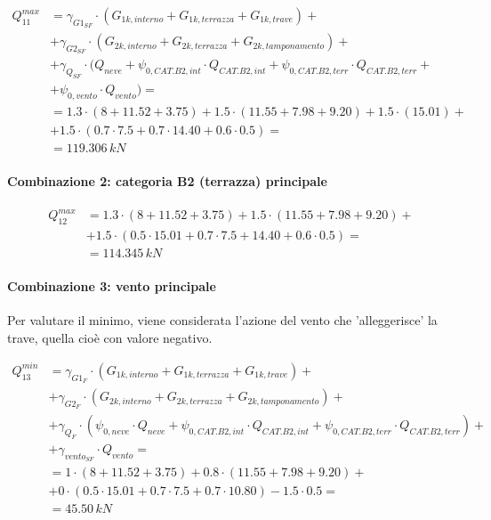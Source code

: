 \begin{align*}
	Q_{11}^{max} &=\gamma_{G1_{SF}}\cdot\left( G_{1k, interno} + G_{1k, terrazza} + G_{1k, trave} \right) +\\
	&+\gamma_{G2_{SF}}\cdot\left( G_{2k, interno} + G_{2k, terrazza} + G_{2k, tamponamento} \right) +\\
	&+\gamma_{Q_{SF}}\cdot (Q_{neve} + \psi_{0,CAT.B2,int}\cdot Q_{CAT.B2,int} + \psi_{0,CAT.B2,terr}\cdot Q_{CAT.B2,terr} +\\
	&+\psi_{0,vento}\cdot Q_{vento}) =\\
	&= 1.3\cdot(8+11.52 + 3.75)	+1.5\cdot(11.55+7.98 + 9.20) + 1.5\cdot(15.01) +\\
	&+1.5\cdot(0.7\cdot7.5+ 0.7\cdot 14.40 + 0.6\cdot 0.5) = \\
	&= 	119.306\,kN
\end{align*}






\paragraph{Combinazione 2: categoria B2 (terrazza) principale}

\begin{align*}
	Q_{12}^{max} &= 1.3\cdot(8+11.52 + 3.75) 
	+1.5\cdot(11.55+7.98 + 9.20) +\\
	&+1.5\cdot(0.5\cdot 15.01 + 0.7\cdot7.5+ 14.40 + 0.6\cdot 0.5) = \\
	&= 	114.345\,kN
\end{align*}

\paragraph{Combinazione 3: vento principale}
Per valutare il minimo, viene considerata l'azione del vento che 'alleggerisce' la trave, quella cioè con valore negativo.

\begin{align*}
	Q_{13}^{min} &=\gamma_{G1_{F}}\cdot\left( G_{1k, interno} + G_{1k, terrazza} + G_{1k, trave} \right) +\\
	&+\gamma_{G2_{F}}\cdot\left( G_{2k, interno} + G_{2k, terrazza} + G_{2k, tamponamento} \right) +\\
	&+\gamma_{Q_{F}}\cdot (\psi_{0,neve}\cdot Q_{neve} + \psi_{0,CAT.B2,int}\cdot Q_{CAT.B2,int} + \psi_{0,CAT.B2,terr}\cdot Q_{CAT.B2,terr}) +\\
	&+ \gamma_{vento_{SF}}\cdot Q_{vento} =\\
	&= 1\cdot(8+11.52 + 3.75) +0.8 \cdot(11.55+7.98 + 9.20) +\\
	&+ 0\cdot(0.5\cdot 15.01 + 0.7\cdot7.5+ 0.7\cdot 10.80) - 1.5\cdot 0.5 = \\
	&= 	45.50\,kN
\end{align*}

